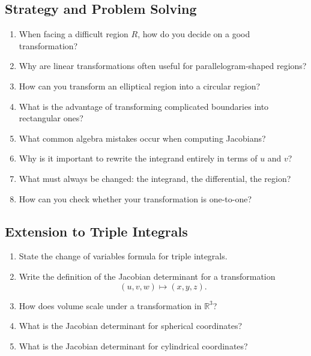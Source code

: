 \subsection{Strategy and Problem Solving}
\begin{enumerate}[resume]
  \item When facing a difficult region $R$, how do you decide on a good transformation?
  \item Why are linear transformations often useful for parallelogram-shaped regions?
  \item How can you transform an elliptical region into a circular region?
  \item What is the advantage of transforming complicated boundaries into rectangular ones?
  \item What common algebra mistakes occur when computing Jacobians?
  \item Why is it important to rewrite the integrand entirely in terms of $u$ and $v$?
  \item What must always be changed: the integrand, the differential, the region?
  \item How can you check whether your transformation is one-to-one?
\end{enumerate}

\subsection{Extension to Triple Integrals}
\begin{enumerate}[resume]
  \item State the change of variables formula for triple integrals.
  \item Write the definition of the Jacobian determinant for a transformation
    \[
      (u,v,w) \mapsto (x,y,z).
    \]
  \item How does volume scale under a transformation in $\mathbb{R}^3$?
  \item What is the Jacobian determinant for spherical coordinates?
  \item What is the Jacobian determinant for cylindrical coordinates?
\end{enumerate}

